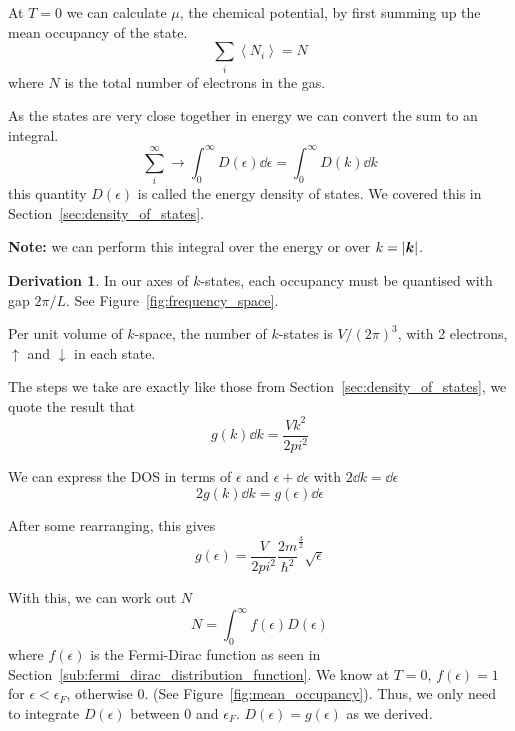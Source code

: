 \documentclass[12pt,chapterprefix=false,dvipsnames]{scrbook}
\theoremstyle{dotless}
\theoremstyle{definition}
\newtheorem{protoderivation}{Derivation}[section]
\newenvironment{derivation}
{\colorlet{shadecolor}{purple!15}\begin{shaded}\begin{protoderivation}}
			{\end{protoderivation}\end{shaded}}
\def\vec#1{{\ensuremath{\bm{{#1}}}}}
\begin{document}
At $T = 0$ we can calculate
$\mu$, the chemical potential, by first
summing up the mean occupancy of the state.
\begin{equation}
	\sum_i \left<N_i\right> = N
\end{equation}
where $N$ is the total number of electrons
in the gas.

As the states are very close together in energy we can convert
the sum to an integral.
\begin{equation}
	\sum_i^\infty\rightarrow\int_0^\infty
	D\left(\epsilon\right)\dd{\epsilon} = \int_0^\infty
	D\left(k\right)\dd{k}
\end{equation}
this quantity $D\left(\epsilon\right)$ is called the energy
density of states. We covered this in
Section~\ref{sec:density_of_states}.

\textbf{Note:} we can perform this integral over the
energy or over $k=\absolutevalue{\vec{k}}$.

\begin{derivation}
	In our axes of $k$-states, each occupancy
	must be quantised with gap $2\pi/L$. See
	Figure~\ref{fig:frequency_space}.

	Per unit volume of $k$-space, the number of
	$k$-states is $V/{\left(2\pi\right)}^3$, with
	2 electrons, $\uparrow$ and $\downarrow$
	in each state.

	The steps we take are exactly like those from
	Section~\ref{sec:density_of_states}, we quote the result that
	\begin{equation}
		g\left(k\right)\dd{k} =
		\frac{Vk^2}{2pi^2}
	\end{equation}

	We can express the DOS in terms of $\epsilon$ and
	$\epsilon + \dd{\epsilon}$ with $2\dd{k} = \dd{\epsilon}$
	\begin{equation}
		2g\left(k\right)\dd{k} =
		g\left(\epsilon\right)\dd{\epsilon}
	\end{equation}

	After some rearranging, this gives
	\begin{equation}
		g\left(\epsilon\right) =
		\frac{V}{2pi^2}{\frac{2m}{\hbar^2}}^{\frac{3}{2}}\sqrt{\epsilon}
	\end{equation}
\end{derivation}

With this, we can work out $N$
\begin{equation}
	N = \int^\infty_0 f\left(\epsilon\right)D\left(\epsilon\right)
\end{equation}
where $f\left(\epsilon\right)$ is the Fermi-Dirac function as
seen in Section~\ref{sub:fermi_dirac_distribution_function}. We know at
$T = 0$, $f\left(\epsilon\right) = 1$ for
$\epsilon < \epsilon_{F}$, otherwise 0. (See
Figure~\ref{fig:mean_occupancy}). Thus, we only need to
integrate $D\left(\epsilon\right)$ between 0 and
$\epsilon_{F}$. $D\left(\epsilon\right) = g\left(\epsilon\right)$ as we derived.
\end{document}
